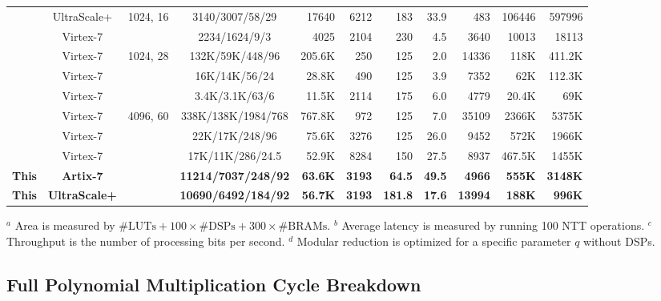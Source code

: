 \documentclass[a4paper, 12pt, titlepage]{article}
\begin{document}
\begin{table}[H]
{\begin{tabular}{|c|c|c|c|r|r|r|r|r|r|r|}
\hline
\cite{pipe-18} & UltraScale+ & \multirow{2}{*}{1024, 16} & 3140/3007/58/29 & 17640 & 6212 & 183 & 33.9 & 483 & 106446 & 597996 \\
\cline{1-2}\cline{4-11}
\cite{pipentt} & Virtex-7 & & 2234/1624/9/3 & 4025 & 2104 & 230 & 4.5 & 3640 & 10013 & 18113 \\
\hline
\cite{pipe-5} & Virtex-7 & \multirow{3}{*}{1024, 28} & 132K/59K/448/96 & 205.6K & 250 & 125 & 2.0 & 14336 & 118K & 411.2K \\
\cline{1-2}\cline{4-11}
\cite{pipe-5} & Virtex-7 & & 16K/14K/56/24 & 28.8K & 490 & 125 & 3.9 & 7352 & 62K & 112.3K \\
\cline{1-2}\cline{4-11}
\cite{pipentt} & Virtex-7 & & 3.4K/3.1K/63/6 & 11.5K & 2114 & 175 & 6.0 & 4779 & 20.4K & 69K \\
\hline
\cite{pipe-5} & Virtex-7 & \multirow{5}{*}{4096, 60} & 338K/138K/1984/768 & 767.8K & 972 & 125 & 7.0 & 35109 & 2366K & 5375K \\
\cline{1-2}\cline{4-11}
\cite{pipe-5} & Virtex-7 & & 22K/17K/248/96 & 75.6K & 3276 & 125 & 26.0 & 9452 & 572K & 1966K \\
\cline{1-2}\cline{4-11}
\cite{pipentt} & Virtex-7 & & 17K/11K/286/24.5 & 52.9K & 8284 & 150 & 27.5 & 8937 & 467.5K & 1455K \\
\cline{1-2}\cline{4-11}
\textbf{This} & \textbf{Artix-7} & & \textbf{11214/7037/248/92} & \textbf{63.6K} & \textbf{3193} & \textbf{64.5} & \textbf{49.5} & \textbf{4966} & \textbf{555K} & \textbf{3148K} \\
\cline{1-2}\cline{4-11}
\textbf{This} & \textbf{UltraScale+} & & \textbf{10690/6492/184/92} & \textbf{56.7K} & \textbf{3193} & \textbf{181.8} & \textbf{17.6} & \textbf{13994} & \textbf{188K} & \textbf{996K} \\
\hline
\end{tabular}%
}
\vspace{2pt}
\begin{minipage}{0.96\textwidth}
\scriptsize
\(^a\) Area is measured by \(\#\mathrm{LUTs}+100\times\#\mathrm{DSPs}+300\times\#\mathrm{BRAMs}\).
\(^b\) Average latency is measured by running 100 NTT operations.
\(^c\) Throughput is the number of processing bits per second.
\(^d\) Modular reduction is optimized for a specific parameter \(q\) without DSPs.
\end{minipage}
\end{table}

\subsection{Full Polynomial Multiplication Cycle Breakdown}
\end{document}
